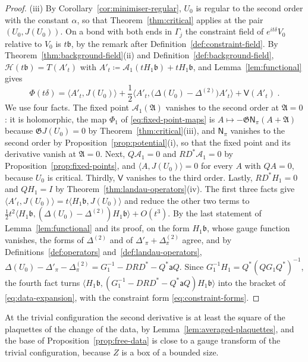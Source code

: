\documentclass[11pt]{preprint}
\numberwithin{equation}{section}
\begin{document}
\begin{proof}
(iii) By Corollary~\ref{cor:minimiser-regular}, $U_0$ is regular to the second order with the constant $\alpha$, so that Theorem~\ref{thm:critical} applies at the pair $(U_0, J(U_0))$. On a bond with both ends in $\Gamma_j$ the constraint field of $e^{it\delta}V_0$ relative to $V_0$ is $t\mathfrak b$, by the remark after Definition~\ref{def:constraint-field}. By Theorem~\ref{thm:background-field}(ii) and Definition~\ref{def:background-field}, $\mathcal H(t\mathfrak b) = T(A'_t)$ with $A'_t \coloneqq \mathcal A_1(tH_1\mathfrak b) + tH_1\mathfrak b$, and Lemma~\ref{lem:functional} gives
\[
    \Phi(t\delta) = \langle A'_t, J(U_0)\rangle + \frac{1}{2}\bigl\langle A'_t, \bigl(\Delta(U_0) - \Delta^{(2)}\bigr)A'_t\bigr\rangle + \mathsf V(A'_t)\;.
\]
We use four facts. The fixed point $\mathcal A_1(\mathfrak A)$ vanishes to the second order at $\mathfrak A = 0$: it is holomorphic, the map $\Phi_1$ of \eqref{eq:fixed-point-maps} is $A \mapsto -\mathfrak G\mathsf N_\pi(A + \mathfrak A)$ because $\mathfrak GJ(U_0) = 0$ by Theorem~\ref{thm:critical}(iii), and $\mathsf N_\pi$ vanishes to the second order by Proposition~\ref{prop:potential}(i), so that the fixed point and its derivative vanish at $\mathfrak A = 0$. Next, $Q\mathcal A_1 = 0$ and $RD^*\mathcal A_1 = 0$ by Proposition~\ref{prop:fixed-points}, and $\langle A, J(U_0)\rangle = 0$ for every $A$ with $QA = 0$, because $U_0$ is critical. Thirdly, $\mathsf V$ vanishes to the third order. Lastly, $RD^*H_1 = 0$ and $QH_1 = I$ by Theorem~\ref{thm:landau-operators}(iv). The first three facts give $\langle A'_t, J(U_0)\rangle = t\langle H_1\mathfrak b, J(U_0)\rangle$ and reduce the other two terms to $\frac{1}{2}t^2\langle H_1\mathfrak b, (\Delta(U_0) - \Delta^{(2)})H_1\mathfrak b\rangle + O(t^3)$. By the last statement of Lemma~\ref{lem:functional} and its proof, on the form $H_1\mathfrak b$, whose gauge function vanishes, the forms of $\Delta^{(2)}$ and of $\Delta'_\pi + \Delta^{(2)}_\pi$ agree, and by Definitions~\ref{def:operators} and~\ref{def:landau-operators}, $\Delta(U_0) - \Delta'_\pi - \Delta^{(2)}_\pi = G_1^{-1} - DRD^* - Q^*\mathsf aQ$. Since $G_1^{-1}H_1 = Q^*(QG_1Q^*)^{-1}$, the fourth fact turns $\langle H_1\mathfrak b, (G_1^{-1} - DRD^* - Q^*\mathsf aQ)H_1\mathfrak b\rangle$ into the bracket of \eqref{eq:data-expansion}, with the constraint form \eqref{eq:constraint-forms}.
\end{proof}

At the trivial configuration the second derivative is at least the square of the plaquettes of the change of the data, by Lemma~\ref{lem:averaged-plaquettes}, and the base of Proposition~\ref{prop:free-data} is close to a gauge transform of the trivial configuration, because $Z$ is a box of a bounded size.
\end{document}
